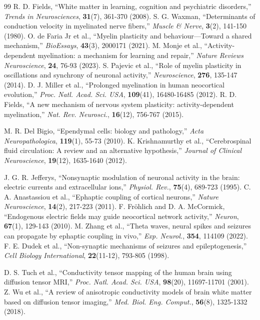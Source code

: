 \documentclass[12pt,a4paper]{article}
\begin{document}
\begin{thebibliography}{99}
		 R. D. Fields, ``White matter in learning, cognition and psychiatric disorders,'' \emph{Trends in Neurosciences}, \textbf{31}(7), 361-370 (2008).
		 S. G. Waxman, ``Determinants of conduction velocity in myelinated nerve fibers,'' \emph{Muscle \& Nerve}, \textbf{3}(2), 141-150 (1980).
		 O. de Faria Jr et al., ``Myelin plasticity and behaviour—Toward a shared mechanism,'' \emph{BioEssays}, \textbf{43}(3), 2000171 (2021).
		 M. Monje et al., ``Activity-dependent myelination: a mechanism for learning and repair,'' \emph{Nature Reviews Neuroscience}, \textbf{24}, 76-93 (2023).
		 S. Pajevic et al., ``Role of myelin plasticity in oscillations and synchrony of neuronal activity,'' \emph{Neuroscience}, \textbf{276}, 135-147 (2014).
		 D. J. Miller et al., ``Prolonged myelination in human neocortical evolution,'' \emph{Proc. Natl. Acad. Sci. USA}, \textbf{109}(41), 16480-16485 (2012).
		 R. D. Fields, ``A new mechanism of nervous system plasticity: activity-dependent myelination,'' \emph{Nat. Rev. Neurosci.}, \textbf{16}(12), 756-767 (2015).
		
		 M. R. Del Bigio, ``Ependymal cells: biology and pathology,'' \emph{Acta Neuropathologica}, \textbf{119}(1), 55-73 (2010).
		 K. Krishnamurthy et al., ``Cerebrospinal fluid circulation: A review and an alternative hypothesis,'' \emph{Journal of Clinical Neuroscience}, \textbf{19}(12), 1635-1640 (2012).
		
		 J. G. R. Jefferys, ``Nonsynaptic modulation of neuronal activity in the brain: electric currents and extracellular ions,'' \emph{Physiol. Rev.}, \textbf{75}(4), 689-723 (1995).
		 C. A. Anastassiou et al., ``Ephaptic coupling of cortical neurons,'' \emph{Nature Neuroscience}, \textbf{14}(2), 217-223 (2011).
		 F. Fröhlich and D. A. McCormick, ``Endogenous electric fields may guide neocortical network activity,'' \emph{Neuron}, \textbf{67}(1), 129-143 (2010).
		 M. Zhang et al., ``Theta waves, neural spikes and seizures can propagate by ephaptic coupling in vivo,'' \emph{Exp. Neurol.}, \textbf{354}, 114109 (2022).
		 F. E. Dudek et al., ``Non-synaptic mechanisms of seizures and epileptogenesis,'' \emph{Cell Biology International}, \textbf{22}(11-12), 793-805 (1998).
		
		 D. S. Tuch et al., ``Conductivity tensor mapping of the human brain using diffusion tensor MRI,'' \emph{Proc. Natl. Acad. Sci. USA}, \textbf{98}(20), 11697-11701 (2001).
		 Z. Wu et al., ``A review of anisotropic conductivity models of brain white matter based on diffusion tensor imaging,'' \emph{Med. Biol. Eng. Comput.}, \textbf{56}(8), 1325-1332 (2018).
		

\end{thebibliography}
\end{document}
